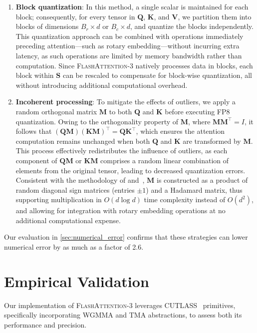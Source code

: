 \begin{enumerate}

\item \textbf{Block quantization}: In this method, a single scalar is maintained for each block; consequently, for every tensor in $\mathbf{Q}$, $\mathbf{K}$, and $\mathbf{V}$, we partition them into blocks of dimensions $B_r \times d$ or $B_c \times d$, and quantize the blocks independently. This quantization approach can be combined with operations immediately preceding attention—such as rotary embedding—without incurring extra latency, as such operations are limited by memory bandwidth rather than computation. Since \textsc{FlashAttention-3} natively processes data in blocks, each block within $\mathbf{S}$ can be rescaled to compensate for block-wise quantization, all without introducing additional computational overhead.
\item \textbf{Incoherent processing}: To mitigate the effects of outliers, we apply a random orthogonal matrix $\mathbf{M}$ to both $\mathbf{Q}$ and $\mathbf{K}$ before executing FP8 quantization. Owing to the orthogonality property of $\mathbf{M}$, where $\mathbf{M} \mathbf{M}^\top = I$, it follows that $(\mathbf{Q} \mathbf{M}) (\mathbf{K} \mathbf{M})^\top = \mathbf{Q} \mathbf{K}^\top$, which ensures the attention computation remains unchanged when both $\mathbf{Q}$ and $\mathbf{K}$ are transformed by $\mathbf{M}$. This process effectively redistributes the influence of outliers, as each component of $\mathbf{Q} \mathbf{M}$ or $\mathbf{K} \mathbf{M}$ comprises a random linear combination of elements from the original tensor, leading to decreased quantization errors. Consistent with the methodology of \citet{chee2024quip} and~\citet{tseng2024quip}, $\mathbf{M}$ is constructed as a product of random diagonal sign matrices (entries $\pm 1$) and a Hadamard matrix, thus supporting multiplication in $O(d \log d)$ time complexity instead of $O(d^2)$, and allowing for integration with rotary embedding operations at no additional computational expense.
\end{enumerate}

Our evaluation in \cref{sec:numerical_error} confirms that these strategies can lower numerical error by as much as a factor of 2.6.

\section{Empirical Validation}
\label{sec:exp}

Our implementation of \textsc{FlashAttention-3} leverages CUTLASS~\citep{Thakkar_CUTLASS_2023} primitives, specifically incorporating WGMMA and TMA abstractions, to assess both its performance and precision.


